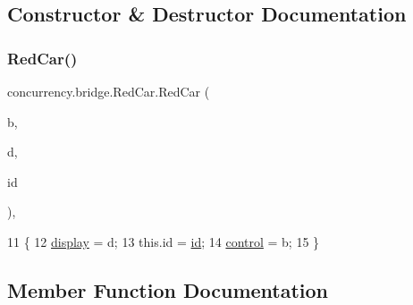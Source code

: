 \subsection{Constructor \& Destructor Documentation}
\mbox{\label{classconcurrency_1_1bridge_1_1_red_car_ac5923e9355634afa3d2ecb9ae6bb1a4e}} 
\subsubsection{\texorpdfstring{Red\+Car()}{RedCar()}}
{\footnotesize\ttfamily concurrency.\+bridge.\+Red\+Car.\+Red\+Car (\begin{DoxyParamCaption}\item[{\mbox{\hyperlink{classconcurrency_1_1bridge_1_1_bridge}{Bridge}}}]{b,  }\item[{\mbox{\hyperlink{classconcurrency_1_1bridge_1_1_bridge_canvas}{Bridge\+Canvas}}}]{d,  }\item[{int}]{id }\end{DoxyParamCaption})\hspace{0.3cm}{\ttfamily [inline]}, {\ttfamily [package]}}


\begin{DoxyCode}
11                                              \{
12         \mbox{\hyperlink{classconcurrency_1_1bridge_1_1_red_car_a74921d6c4626acedf0c000703a4c138b}{display}} = d;
13         this.\textcolor{keywordtype}{id} = \mbox{\hyperlink{classconcurrency_1_1bridge_1_1_red_car_a58bd7fd277a22e90c81bb6d0caa7bed3}{id}};
14         \mbox{\hyperlink{classconcurrency_1_1bridge_1_1_red_car_a8f1e50b1058d7f3a2215c064435655e5}{control}} = b;
15     \}
\end{DoxyCode}


\subsection{Member Function Documentation}
\mbox{\label{classconcurrency_1_1bridge_1_1_red_car_a5666214e241536f7ef5f42e0f9ba17da}} 
